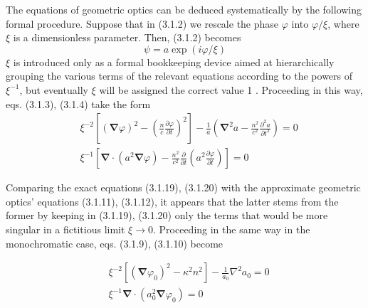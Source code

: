 \documentclass{article}
\begin{document}
The equations of geometric optics can be deduced systematically by the following formal procedure. Suppose that in (3.1.2) we rescale the phase $\varphi$ into $\varphi / \xi$, where $\xi$ is a dimensionless parameter. Then, (3.1.2) becomes
$$
\begin{equation*}
\psi=a \exp (i \varphi / \xi) \tag{3.1.18}
\end{equation*}
$$
$\xi$ is introduced only as a formal bookkeeping device aimed at hierarchically grouping the various terms of the relevant equations according to the powers of $\xi^{-1}$, but eventually $\xi$ will be assigned the correct value 1 . Proceeding in this way, eqs. (3.1.3), (3.1.4) take the form
$$
\begin{align*}
& \xi^{-2}\left[(\boldsymbol{\nabla} \varphi)^{2}-\left(\frac{n}{c} \frac{\partial \varphi}{\partial t}\right)^{2}\right]-\frac{1}{a}\left(\boldsymbol{\nabla}^{2} a-\frac{n^{2}}{c^{2}} \frac{\partial^{2} a}{\partial t^{2}}\right)=0  \tag{3.1.19}\\
& \xi^{-1}\left[\boldsymbol{\nabla} \cdot\left(a^{2} \boldsymbol{\nabla} \varphi\right)-\frac{n^{2}}{c^{2}} \frac{\partial}{\partial t}\left(a^{2} \frac{\partial \varphi}{\partial t}\right)\right]=0 \tag{3.1.20}
\end{align*}
$$

Comparing the exact equations (3.1.19), (3.1.20) with the approximate geometric optics' equations (3.1.11), (3.1.12), it appears that the latter stems from the former by keeping in (3.1.19), (3.1.20) only the terms that would be more singular in a fictitious limit $\xi \rightarrow 0$. Proceeding in the same way in the monochromatic case, eqs. (3.1.9), (3.1.10) become

$$
\begin{align*}
& \xi^{-2}\left[\left(\boldsymbol{\nabla} \varphi_{0}\right)^{2}-\kappa^{2} n^{2}\right]-\frac{1}{a_{0}} \nabla^{2} a_{0}=0  \tag{3.1.21}\\
& \xi^{-1} \boldsymbol{\nabla} \cdot\left(a_{0}^{2} \boldsymbol{\nabla} \varphi_{0}\right)=0 \tag{3.1.22}
\end{align*}
$$
\end{document}
